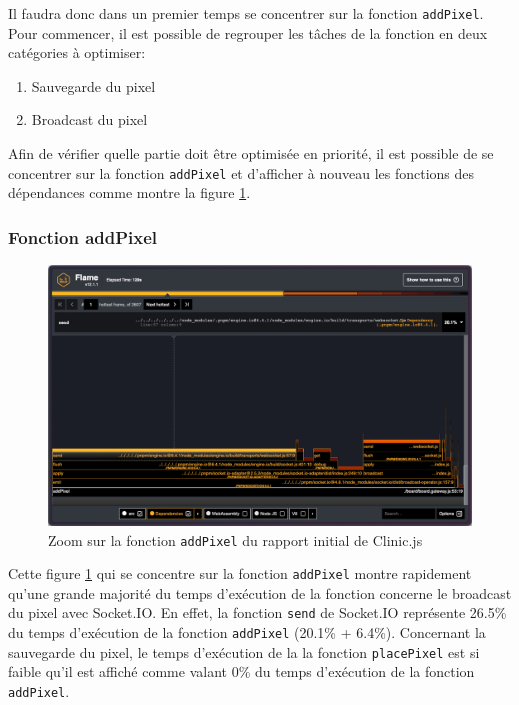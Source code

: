 Il faudra donc dans un premier temps se concentrer sur la fonction \texttt{addPixel}. Pour commencer, il est possible de regrouper les tâches de la fonction en deux catégories à optimiser:

\begin{enumerate}
  \item Sauvegarde du pixel
  \item Broadcast du pixel
\end{enumerate}

Afin de vérifier quelle partie doit être optimisée en priorité, il est possible de se concentrer sur la fonction \texttt{addPixel} et d'afficher à nouveau les fonctions des dépendances comme montre la figure \ref{fig:flame1-addPixel}.

\subsubsection{Fonction addPixel}

\begin{figure}[H]
  \centering
  \includegraphics[width=1\textwidth]{./assets/figures/flame/flame1-addPixel.png}
  \caption{Zoom sur la fonction \texttt{addPixel} du rapport initial de Clinic.js}
  \label{fig:flame1-addPixel}
\end{figure}

Cette figure \ref{fig:flame1-addPixel} qui se concentre sur la fonction \texttt{addPixel} montre rapidement qu'une grande majorité du temps d'exécution de la fonction concerne le broadcast du pixel avec Socket.IO. En effet, la fonction \texttt{send} de Socket.IO représente 26.5\% du temps d'exécution de la fonction \texttt{addPixel} (20.1\% + 6.4\%). Concernant la sauvegarde du pixel, le temps d'exécution de la la fonction \texttt{placePixel} est si faible qu'il est affiché comme valant 0\% du temps d'exécution de la fonction \texttt{addPixel}.

